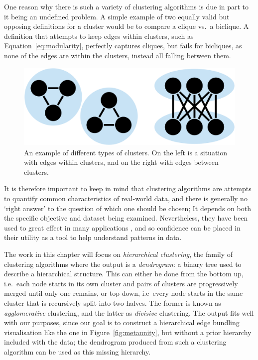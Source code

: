 One reason why there is such a variety of clustering algorithms is due in part to it being an undefined problem. A simple example of two equally valid but opposing definitions for a cluster would be to compare a clique vs.\ a biclique. A definition that attempts to keep edges within clusters, such as Equation~\ref{eq:modularity}, perfectly captures cliques, but fails for bicliques, as none of the edges are within the clusters, instead all falling between them.
\begin{figure}
    \centering
    \includegraphics[width=.8\textwidth]{power/clique_vs_biclique.pdf}
    \caption[Two examples for why clustering is difficult to define]{An example of different types of clusters. On the left is a situation with edges within clusters, and on the right with edges between clusters.}
    \label{fig:clique_vs_biclique}
\end{figure}
It is therefore important to keep in mind that clustering algorithms are attempts to quantify common characteristics of real-world data, and there is generally no `right answer' to the question of which one should be chosen; It depends on both the specific objective and dataset being examined. 
Nevertheless, they have been used to great effect in many applications \cite{Fortunato2016}, and so confidence can be placed in their utility as a tool to help understand patterns in data.

The work in this chapter will focus on \emph{hierarchical clustering}, the family of clustering algorithms where the output is a \textit{dendrogram}: a binary tree used to describe a hierarchical structure.
This can either be done from the bottom up, i.e.\ each node starts in its own cluster and pairs of clusters are progressively merged until only one remains, or top down, i.e\ every node starts in the same cluster that is recursively split into two halves. The former is known as \emph{agglomerative} clustering, and the latter as \emph{divisive} clustering.
The output fits well with our purposes, since our goal is to construct a hierarchical edge bundling visualisation like the one in Figure~\ref{fig:metaunity}, but without a prior hierarchy included with the data; the dendrogram produced from such a clustering algorithm can be used as this missing hierarchy.


